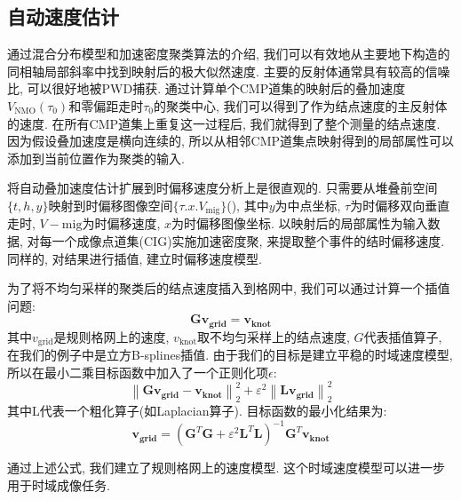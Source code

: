 \subsection{自动速度估计}
通过混合分布模型和加速密度聚类算法的介绍, 我们可以有效地从主要地下构造的同相轴局部斜率中找到映射后的极大似然速度. 主要的反射体通常具有较高的信噪比, 可以很好地被PWD捕获. 通过计算单个CMP道集的映射后的叠加速度$V_{\mathrm{NMO}}(\tau_0)$和零偏距走时$\tau_0$的聚类中心, 我们可以得到了作为结点速度的主反射体的速度. 在所有CMP道集上重复这一过程后, 我们就得到了整个测量的结点速度. 因为假设叠加速度是横向连续的, 所以从相邻CMP道集点映射得到的局部属性可以添加到当前位置作为聚类的输入. 

将自动叠加速度估计扩展到时偏移速度分析上是很直观的. 只需要从堆叠前空间$\{t,h,y\}$映射到时偏移图像空间$\{\tau.x.V_{\mathrm{mig}}\}$(\cite{Fomel2007}), 其中$y$为中点坐标, $\tau$为时偏移双向垂直走时, $V-{\mathrm{mig}}$为时偏移速度, $x$为时偏移图像坐标. 以映射后的局部属性为输入数据, 对每一个成像点道集(CIG)实施加速密度聚, 来提取整个事件的结时偏移速度. 同样的, 对结果进行插值, 建立时偏移速度模型. 

为了将不均匀采样的聚类后的结点速度插入到格网中, 我们可以通过计算一个插值问题: 
\begin{equation}
    \mathbf{G} \mathbf{v}_{\mathbf {grid }}=\mathbf{v}_{\mathbf{k n o t}}
\end{equation}
其中$v_{\mathrm{grid}}$是规则格网上的速度, $v_{\mathrm{knot}}$取不均匀采样上的结点速度, $G$代表插值算子, 在我们的例子中是立方B-splines插值. 由于我们的目标是建立平稳的时域速度模型, 所以在最小二乘目标函数中加入了一个正则化项$\epsilon$: 
\begin{equation}
\left\|\mathbf{G} \mathbf{v}_{\mathbf {grid }}-\mathbf{v}_{\mathbf{k n o t}}\right\|_{2}^{2}+\varepsilon^{2}\left\|\mathbf{L} \mathbf{v}_{\mathbf{g r i d}}\right\|_{2}^{2}
\end{equation}
其中L代表一个粗化算子(如Laplacian算子). 目标函数的最小化结果为: 
\begin{equation}
    \mathbf{v}_{\mathbf{g r i d}}=\left(\mathbf{G}^{T} \mathbf{G}+\varepsilon^{2} \mathbf{L}^{T} \mathbf{L}\right)^{-1} \mathbf{G}^{T} \mathbf{v}_{\mathbf{k n o t}}
\end{equation}

通过上述公式, 我们建立了规则格网上的速度模型. 这个时域速度模型可以进一步用于时域成像任务. 
